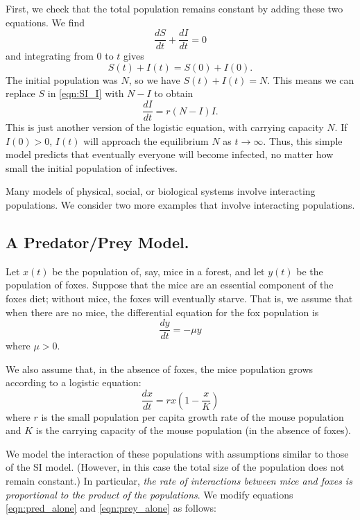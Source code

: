 \documentclass[reqno]{immbook}
\numberwithin{equation}{chapter}
\numberwithin{question}{section}
\numberwithin{theorem}{chapter}
\numberwithin{figure}{chapter}
\theoremstyle{definition}
\begin{document}
First, we check that the total population remains constant by adding these
two equations.  We find
\begin{equation}
  \frac{dS}{dt} + \frac{dI}{dt} = 0
\end{equation}
and integrating from $0$ to $t$ gives
\begin{equation}
  S(t) + I(t) = S(0)+I(0).
\end{equation}
The initial population was $N$, so we have
$S(t)+I(t)=N$.
This means we can replace $S$ in \eqref{eqn:SI_I} with
$N-I$ to obtain
\begin{equation}
  \frac{dI}{dt} = r(N-I)I.
\end{equation}
This is just another version of the logistic equation,
with carrying capacity $N$.
If $I(0)>0$,  $I(t)$ will approach the
equilibrium $N$ as $t\rightarrow\infty$.
Thus, this simple model predicts that
eventually everyone will become infected, no matter how small
the initial population of infectives.


\medskip
Many models of physical, social, or biological systems
involve interacting populations.
We consider two more examples that involve interacting
populations.

\subsection{A Predator/Prey Model.}
Let $x(t)$ be the population of, say, mice in a forest,
and let $y(t)$ be the population of foxes.
Suppose that the mice
are an essential component of the foxes diet; without
mice, the foxes will eventually starve.
That is, we assume that when there are no mice, the
differential equation for the fox population is
\begin{equation}
   \frac{dy}{dt} = -\mu y
\label{eqn:pred_alone}
\end{equation}
where $\mu > 0$.

We also assume that, in the absence of foxes,
the mice population grows
according to a logistic equation:
\begin{equation}
   \frac{dx}{dt} = rx\left(1-\frac{x}{K}\right)
\label{eqn:prey_alone}
\end{equation}
where $r$ is the small population per capita growth rate
of the mouse population and $K$ is the carrying capacity
of the mouse population (in the absence of foxes).

We model the interaction of these populations
with assumptions similar to those of the SI model.
(However, in this case the total size of the population
does not remain constant.)
In particular,
\emph{the rate of interactions between
mice and foxes is proportional to the product
of the populations}.
We modify equations \eqref{eqn:pred_alone}
and \eqref{eqn:prey_alone} as follows:
\end{document}
